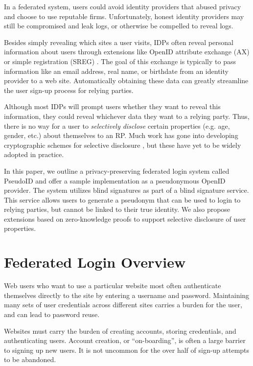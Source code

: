 \documentclass{llncs}
\begin{document}
In a federated system, users could avoid identity providers
that abused privacy and choose to use reputable firms. Unfortunately,
honest identity providers may still be compromised and leak logs, or
otherwise be compelled to reveal logs.

Besides simply revealing which sites a user visits, IDPs often reveal
personal information about users through extensions like OpenID
attribute exchange (AX) \cite{AX} or simple registration (SREG)
\cite{Sreg}. The goal of this exchange is typically to pass
information like an email address, real name, or birthdate from an
identity provider to a web site. Automatically obtaining these data
can greatly streamline the user sign-up process for relying parties.

Although most IDPs will prompt users whether they want to reveal this
information, they could reveal whichever data they want to a relying
party. Thus, there is no way for a user to \emph{selectively disclose}
certain properties (e.g. age, gender, etc.) about themselves to an
RP. Much work has gone into developing cryptographic schemes for
selective disclosure \cite{CaLy01,CaLy04,CHL05,CaGr08}, but these have
yet to be widely adopted in practice.

In this paper, we outline a privacy-preserving federated login system
called PseudoID and offer a sample implementation as a pseudonymous
OpenID provider. The system utilizes blind signatures \cite{Cha82} as
part of a blind signature service. This service allows users to
generate a pseudonym that can be used to login to relying parties, but
cannot be linked to their true identity. We also propose 
extensions based on zero-knowledge proofs \cite{GMR89} to support
selective disclosure of user properties.

\section{Federated Login Overview}
\label{sec:fedlogin}

Web users who want to use a particular website most often authenticate
themselves directly to the site by entering a username and
password. Maintaining many sets of user credentials across different
sites carries a burden for the user, and can lead to password
reuse.

Websites must carry the burden of creating accounts, storing
credentials, and authenticating users. Account creation, or
``on-boarding'', is often a large barrier to signing up new users. It
is not uncommon for the over half of sign-up attempts to be
abandoned. 
\end{document}
